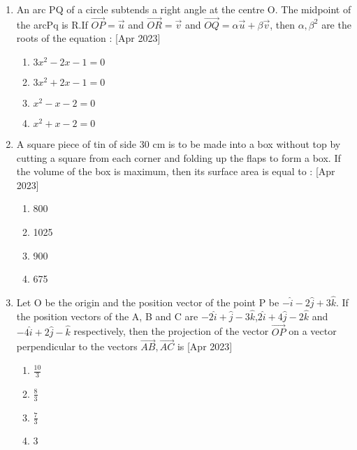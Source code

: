 \documentclass[journal]{IEEEtran}
\begin{document}
\begin{enumerate}
\setcounter{enumi}{0}
 
    \item An arc PQ of a circle subtends a right angle at the centre O. The midpoint of the arcPq is R.If $\overrightarrow{OP}=\overrightarrow{u}$ and $\overrightarrow{OR}=\overrightarrow{v}$ and $\overrightarrow{OQ}=\alpha \overrightarrow{u}+\beta \overrightarrow{v}$, then $\alpha, \beta^2$ are the roots of the equation :
    \hfill{[Apr 2023]}
        \begin{multicols}{1}
            \begin{enumerate}
                \item $3x^2-2x-1=0$
                \item $3x^2+2x-1=0$
                \item $x^2-x-2=0$
                \item $x^2+x-2=0$
            \end{enumerate}
        \end{multicols}

    \item A square piece of tin of side 30 cm is to be made into a box without top by cutting a square from each corner
and folding up the flaps to form a box. If the volume of the box is maximum, then its surface area  is
equal to :
 \hfill{[Apr 2023]}

		\begin{multicols}{4}
			\begin{enumerate}
				\item 800
				\item  1025
				\item  900
				\item  675
			\end{enumerate}
		\end{multicols}

    \item Let O be the origin and the position vector of the point P be $-\hat{i}-2\hat{j}+3\hat{k}.$ If the position vectors of the A, B
and C are $-2\hat{i}+\hat{j}-3\hat{k}$,$2\hat{i}+4\hat{j}-2\hat{k}$ and $-4\hat{i}+2\hat{j}-\hat{k}$ respectively, then the projection of the vector $\overrightarrow{OP}$ on a vector perpendicular to the vectors $\overrightarrow{AB},\overrightarrow{AC}$ is 
 \hfill{[Apr 2023]}
        \begin{multicols}{4}
            \begin{enumerate}
              \item $\frac{10}{3}$
              \item $\frac{8}{3}$
              \item $\frac{7}{3}$
              \item $3$
            \end{enumerate}
        \end{multicols}


\end{enumerate}
\end{document}

